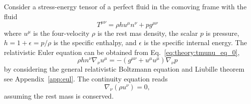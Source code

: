 Consider a stress-energy tensor of a perfect fluid in the comoving frame with the fluid
%
\begin{equation}
    T^{\mu\nu} = \rho h u^{\mu}n^{\nu} + p g^{\mu\nu}
\end{equation}
%
where $u^{\mu}$ is the four-velocity
$\rho$ is the rest mas density, the scalar $p$ is pressure, 
$h = 1 + \epsilon = p/\rho$ is the specific enthalpy, and $\epsilon$ is the specific internal energy.
%
The relativistic Euler equation can be obtained from Eq.~\eqref{eq:theory:tmunu_eq_0}, 
%
\begin{equation}
    \rho h n^{\nu} \nabla_{\nu}u^{\mu} = - (g^{\mu\nu} + u^{\mu}u^{\mu})\nabla_{\nu}p
\end{equation}
%
by considering the general relativistic Boltzmann equation and Liubille theorem 
see Appendix~\ref{app:eul}.
%
The continuity equation reads 
%
\begin{equation}
    \nabla_{\nu}(\rho u^{\nu}) = 0,
\end{equation}
%
assuming the rest mass is conserved.


